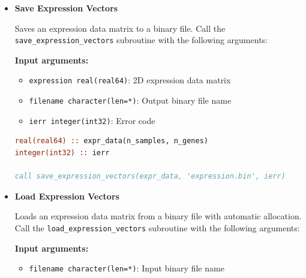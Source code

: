 \begin{enumerate}
\begin{itemize}
\begin{lstlisting}[language=Fortran, caption={Load Gene IDs Array}]
call load_gene_ids(loaded_gene_ids, 'gene_ids.bin', ierr)
! loaded_gene_ids automatically allocated with correct size 
! and character length
                  \end{lstlisting}
                  
            \item \textbf{Save Expression Vectors}
                  
                  Saves an expression data matrix to a binary file. Call the \texttt{save\_expression\_vectors}
                  subroutine with the following arguments:
                  
                  \textbf{Input arguments:}
                  \begin{itemize}
                    \item \texttt{expression real(real64)}: 2D expression data matrix
                          
                    \item \texttt{filename character(len=*)}: Output binary file name
                          
                    \item \texttt{ierr integer(int32)}: Error code
                  \end{itemize}
                  \begin{lstlisting}[language=Fortran, caption={Save Expression Data}]
real(real64) :: expr_data(n_samples, n_genes)
integer(int32) :: ierr

call save_expression_vectors(expr_data, 'expression.bin', ierr)
                  \end{lstlisting}
                  
            \item \textbf{Load Expression Vectors}
                  
                  Loads an expression data matrix from a binary file with automatic allocation.
                  Call the \texttt{load\_expression\_vectors} subroutine with the following
                  arguments:
                  
                  \textbf{Input arguments:}
                  \begin{itemize}
                    \item \texttt{filename character(len=*)}: Input binary file name
                          

\end{itemize}
\end{itemize}
\end{enumerate}
